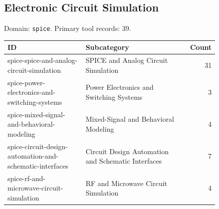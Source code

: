 \subsection{Electronic Circuit Simulation}
\noindent Domain: \texttt{spice}. Primary tool records: 39.
\begin{longtable}{p{0.37\linewidth}p{0.47\linewidth}r}
ID & Subcategory & Count\\\hline\endhead
spice-spice-and-analog-circuit-simulation & SPICE and Analog Circuit Simulation & 31\\
spice-power-electronics-and-switching-systems & Power Electronics and Switching Systems & 3\\
spice-mixed-signal-and-behavioral-modeling & Mixed-Signal and Behavioral Modeling & 4\\
spice-circuit-design-automation-and-schematic-interfaces & Circuit Design Automation and Schematic Interfaces & 7\\
spice-rf-and-microwave-circuit-simulation & RF and Microwave Circuit Simulation & 4\\
\end{longtable}
